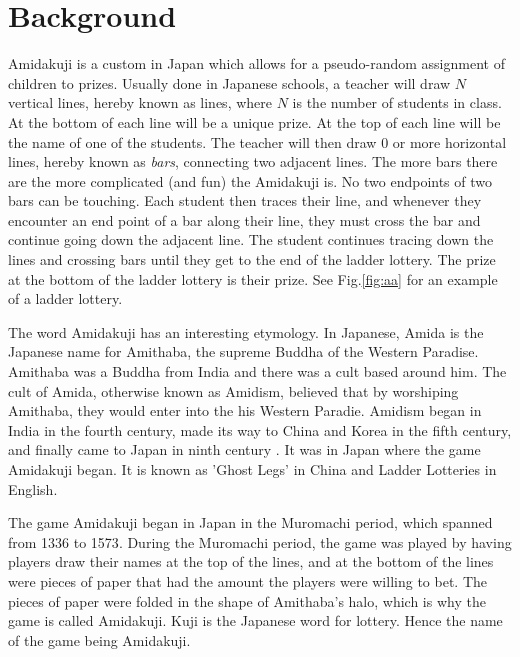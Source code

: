 \section{Background}
Amidakuji is a custom in Japan which 
allows for a pseudo-random assignment of children to prizes\cite{A1}. 
Usually done in Japanese schools, a teacher will draw $N$ vertical lines, 
hereby known as lines, where $N$ is the number of students in class. 
At the bottom of each line will be a unique prize. At the top of each line will be the name of one of the students.  
The teacher will then draw 0 or more horizontal lines, hereby known as \emph{bars}, 
connecting two adjacent lines. The more bars there are the more complicated (and fun) 
the Amidakuji is. No two endpoints of two bars can be touching. Each student then traces 
their line, and whenever they encounter an end point of a bar along their line, 
they must cross the bar and continue going down the adjacent line. 
The student continues tracing down the lines and crossing bars 
until they get to the end of the ladder lottery. The prize at the bottom of the ladder lottery 
is their prize\cite{A1}. See Fig.\ref{fig:aa} for an example of a ladder lottery.\par
The word Amidakuji has an interesting etymology. In Japanese, Amida is the Japanese name 
for Amithaba, the supreme Buddha of the Western Paradise. Amithaba
was a Buddha from India and there was a cult based around him. The cult 
of Amida, otherwise known as Amidism, believed that by worshiping Amithaba, they would 
enter into the his Western Paradie\cite{A0}. Amidism began in India in the fourth century,
made its way to China and Korea in the fifth century, and finally  came 
to Japan in ninth century \cite{A0}. It was in Japan where the game Amidakuji
began. It is known as 'Ghost Legs' in China and Ladder Lotteries in English.\par
The game Amidakuji began in Japan in the Muromachi period, which spanned from
1336 to 1573\cite{A0}. During the Muromachi period, the game was played by having
players draw their names at the top of the lines, and at the bottom 
of the lines were pieces of paper that had the amount the players
were willing to bet. The pieces of paper were folded in the shape of 
Amithaba's halo, which is why the game is called Amidakuji. Kuji 
is the Japanese word for lottery. Hence the name of the game being 
Amidakuji.\par 

